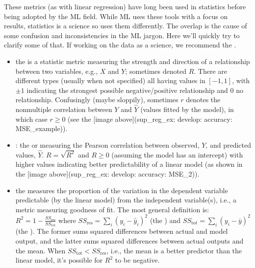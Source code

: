 \documentclass[letterpaper,10pt,english]{jupyterBook}
\begin{document}
\sphinxAtStartPar
These metrics (as with linear regression) have long been used in statistics before being adopted by the ML field. While ML uses these tools with a focus on results, statistics is a science so uses them differently. The overlap is the cause of some confusion and inconsistencies in the ML jargon. Here we’ll quickly try to clarify some of that. If working on the data as a science, we recommend the .
\begin{itemize}
\item {} 
\sphinxAtStartPar
{} the  is a statistic metric measuring the strength and direction of a  relationship between two variables, e.g., \(X\) and \(Y\); sometimes denoted \(R\). There are different types (usually  when not specified) all having values in \([-1,1]\), with \(\pm 1\) indicating the strongest possible negative/positive relationship and \(0\) no relationship. Confusingly (maybe sloppily), sometimes \(r\) denotes the non\sphinxhyphen{}multiple correlation between \(Y\) and \(\hat{Y}\) (values fitted by the model), in which case \(r\geq 0\) (see the {[}image above{]}(sup\_reg\_ex: develop: accuracy: MSE\_example)).

\item {} 
\sphinxAtStartPar
{}: the  or  measuring the Pearson correlation between observed, \(Y\), and predicted values, \(\hat{Y}\). \(R=\sqrt{R^{2}}\) and \(R\geq 0\) (assuming the model has an intercept) with higher values indicating better predictability of a linear model (as shown in the {[}image above{]}(sup\_reg\_ex: develop: accuracy: MSE\_2)).

\item {} 
\sphinxAtStartPar
{} the  measures the proportion of the variation in the dependent variable predictable (by the linear model) from the independent variable(s), i.e., a metric measuring goodness of fit. The most general definition is: \(R^{2}= 1 -\frac{SS_{\text{res}}}{SS_{\text{tot}}}\) where \(SS_{\text{res}}=\sum_{i}(y_i-\hat{y}_i)^2\) (the ) and \(SS_{\text{tot}}=\sum_{i}(y_i-\bar{y})^2\) (the ). The former sums squared differences between actual and model output, and the latter sums squared differences between actual outputs and the mean. When \(SS_{\text{tot}}<SS_{\text{res}}\), i.e., the mean is a better predictor than the linear model, it’s possible for \(R^{2}\) to be negative.


\end{itemize}
\end{document}
